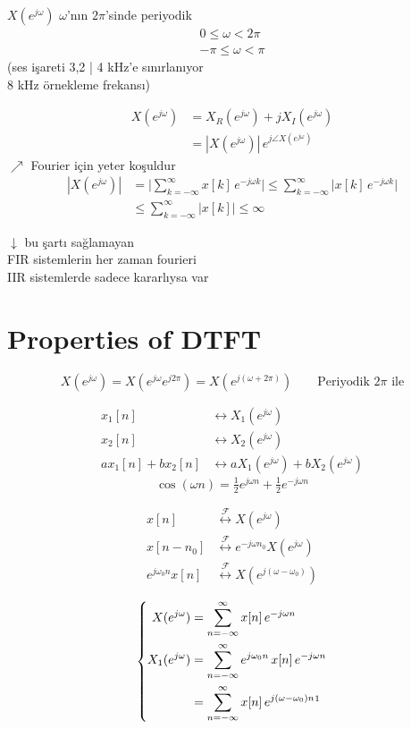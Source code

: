\documentclass[11pt,a4paper]{article}
\begin{document}
$X(e^{j\omega})$ $\omega$'nın $2\pi$'sinde periyodik
\begin{gather*}
0\le\omega<2\pi\\
-\pi\le\omega<\pi
\end{gather*}
(ses işareti 3,2 | 4 kHz'e sınırlanıyor\\
8 kHz örnekleme frekansı)

\begin{align*}
X(e^{j\omega}) &= X_R(e^{j\omega})+jX_I(e^{j\omega})\\
&= |X(e^{j\omega})|\,e^{j\angle X(e^{j\omega})}
\end{align*}
$\nearrow$ Fourier için yeter koşuldur
\begin{align*}
|X(e^{j\omega})| &= \Big|\sum_{k=-\infty}^{\infty} x[k]\,e^{-j\omega k}\Big|
\le \sum_{k=-\infty}^{\infty} \big|x[k]\,e^{-j\omega k}\big|\\
&\le \sum_{k=-\infty}^{\infty} |x[k]| \le \infty
\end{align*}

$\downarrow$ bu şartı sağlamayan\\
FIR sistemlerin her zaman fourieri\\
IIR sistemlerde sadece kararlıysa var

\section{Properties of DTFT}
\[ X(e^{j\omega})=X(e^{j\omega}e^{j2\pi})=X(e^{j(\omega+2\pi)}) \qquad \text{Periyodik } 2\pi \text{ ile} \]

\begin{align*}
x_1[n] &\longleftrightarrow X_1(e^{j\omega})\\
x_2[n] &\longleftrightarrow X_2(e^{j\omega})\\
ax_1[n]+bx_2[n] &\longleftrightarrow aX_1(e^{j\omega})+bX_2(e^{j\omega})
\end{align*}
\[ \cos(\omega n)=\tfrac{1}{2}e^{j\omega n}+\tfrac{1}{2}e^{-j\omega n} \]

\begin{align*}
x[n] &\overset{\mathcal{F}}{\longleftrightarrow} X(e^{j\omega})\\
x[n-n_0] &\overset{\mathcal{F}}{\longleftrightarrow} e^{-j\omega n_0}X(e^{j\omega})\\
e^{j\omega_0 n}x[n] &\overset{\mathcal{F}}{\longleftrightarrow} X(e^{j(\omega-\omega_0)})
\end{align*}

\[
\left\{\begin{aligned}
X(e^{j\omega}) &= \sum_{n=-\infty}^{\infty} x[n]\,e^{-j\omega n}\\
X_1(e^{j\omega}) &= \sum_{n=-\infty}^{\infty} e^{j\omega_0 n}\,x[n]\,e^{-j\omega n}\\
&= \sum_{n=-\infty}^{\infty} x[n]\,e^{j(\omega-\omega_0)n}\footnotemark
\end{aligned}\right.
\]
\end{document}
